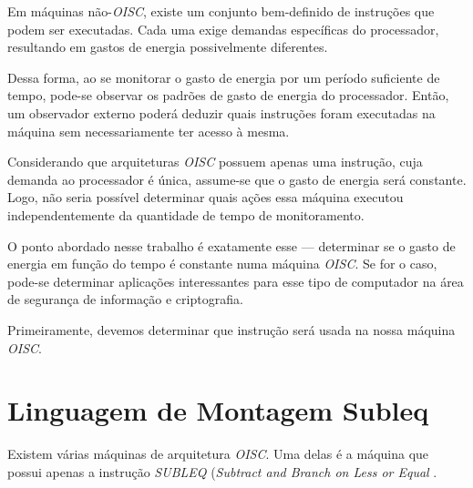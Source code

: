 Em máquinas não-\textit{OISC}, existe um conjunto bem-definido de instruções que
podem ser executadas. Cada uma exige demandas específicas do processador,
resultando em gastos de energia possivelmente diferentes.

Dessa forma, ao se monitorar o gasto de energia por um período suficiente de
tempo, pode-se observar os padrões de gasto de energia do processador. Então, um
observador externo poderá deduzir quais instruções foram executadas na máquina
sem necessariamente ter acesso à mesma.

Considerando que arquiteturas \textit{OISC} possuem apenas uma instrução, cuja
demanda ao processador é única, assume-se que o gasto de energia será
constante. Logo, não seria possível determinar quais ações essa máquina executou
independentemente da quantidade de tempo de monitoramento.

O ponto abordado nesse trabalho é exatamente esse --- determinar se o gasto de
energia em função do tempo é constante numa máquina \textit{OISC}. Se for o
caso, pode-se determinar aplicações interessantes para esse tipo de computador
na área de segurança de informação e criptografia.

Primeiramente, devemos determinar que instrução será usada na nossa máquina
\textit{OISC}.

\section{Linguagem de Montagem Subleq}
\label{sec:subleq}

Existem várias máquinas de arquitetura \textit{OISC}. Uma delas é a máquina que
possui apenas a instrução \textit{SUBLEQ} (\textit{Subtract and Branch on Less
  or Equal} \cite{subleq}.


